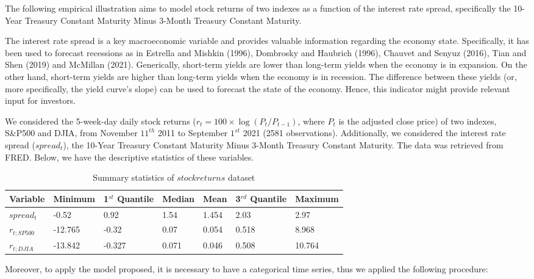 The following empirical illustration aims to model stock returns of two indexes as a function of the interest rate spread, specifically the 10-Year Treasury Constant Maturity Minus 3-Month Treasury Constant Maturity.

The interest rate spread is a key macroeconomic variable and provides valuable information regarding the economy state. Specifically, it has been used to forecast recessions as in Estrella and Mishkin (1996), Dombrosky and Haubrich (1996), Chauvet and Senyuz (2016), Tian and Shen (2019) and McMillan (2021). Generically, short-term yields are lower than long-term yields when the economy is in expansion. On the other hand, short-term yields are higher than long-term yields when the economy is in recession. The difference between these yields (or, more specifically, the yield curve's slope) can be used to forecast the state of the economy. Hence, this indicator might provide relevant input for investors.

We considered the 5-week-day daily stock returns (\(r_t=100 \times \log(P_t/P_{t-1})\), where \(P_t\) is the adjusted close price) of two indexes, S\&P500 and DJIA, from November \(11^{th}\) 2011 to September \(1^{st}\) 2021 (2581 observations). Additionally, we considered the interest rate spread (\(spread_{t}\)), the 10-Year Treasury Constant Maturity Minus 3-Month Treasury Constant Maturity. The data was retrieved from FRED. Below, we have the descriptive statistics of these variables.

\begin{table}

\caption{\label{tab:summary-stat-tex}Summary statistics of $stockreturns$ dataset}
\centering
\begin{tabular}[t]{l|l|l|l|l|l|l}
\hline
Variable & Minimum & 1$^{st}$ Quantile & Median & Mean & 3$^{rd}$ Quantile & Maximum\\
\hline
$spread_{t}$ & -0.52 & 0.92 & 1.54 & 1.454 & 2.03 & 2.97\\
\hline
$r_{t;SP500}$ & -12.765 & -0.32 & 0.07 & 0.054 & 0.518 & 8.968\\
\hline
$r_{t;DJIA}$ & -13.842 & -0.327 & 0.071 & 0.046 & 0.508 & 10.764\\
\hline
\end{tabular}
\end{table}

Moreover, to apply the model proposed, it is necessary to have a categorical time series, thus we applied the following procedure:

